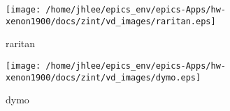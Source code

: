 \noindent
\vspace{1.4cm}
\begin{minipage}{.2\textwidth}
\begin{center}
\texttt{[image: /home/jhlee/epics\_env/epics-Apps/hw-xenon1900/docs/zint/vd\_images/raritan.eps]}
\end{center}
\end{minipage}
\begin{minipage}{.7\textwidth}
raritan
\end{minipage}


\noindent
\vspace{1.4cm}
\begin{minipage}{.2\textwidth}
\begin{center}
\texttt{[image: /home/jhlee/epics\_env/epics-Apps/hw-xenon1900/docs/zint/vd\_images/dymo.eps]}
\end{center}
\end{minipage}
\begin{minipage}{.7\textwidth}
dymo
\end{minipage}


